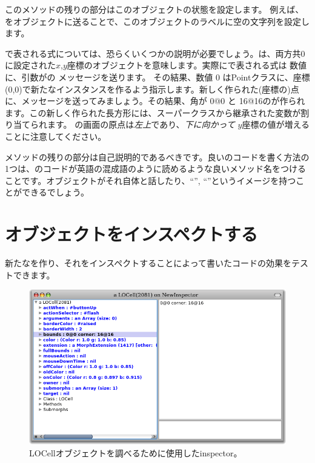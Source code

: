 \documentclass[a4paper,10pt,twoside]{book}
\begin{document}
このメソッドの残りの部分はこのオブジェクトの状態を設定します。
例えば、をオブジェクトに送ることで、このオブジェクトのラベルに空の文字列を設定します。

で表される式については、恐らくいくつかの説明が必要でしょう。は、両方共0に設定された$x$,$y$座標のオブジェクトを意味します。実際にで表される式は 数値に、引数がの メッセージを送ります。
その結果、数値 0 はPointクラスに、座標(0,0)で新たなインスタンスを作るよう指示します。新しく作られた(座標の)点に、メッセージを送ってみましょう。その結果、角が 0@0 と 16@16のが作られます。この新しく作られた長方形には、スーパークラスから継承された変数が割り当てられます。\pharo{} の画面の原点は\emph{左上}であり、\emph{下に向かって} $y$座標の値が増えることに注意してください。

メソッドの残りの部分は自己説明的であるべきです。良い\st{}のコードを書く方法の1つは、\st{}のコードが英語の混成語のように読めるような良いメソッド名をつけることです。オブジェクトがそれ自体と話したり、``'', ``''というイメージを持つことができるでしょう。

\section{オブジェクトをインスペクトする}

新たなを作り、それをインスペクトすることによって書いたコードの効果をテストできます。


\begin{figure}[htbp]
   \centering
   \includegraphics[width=\textwidth]{LOCellInspector} 
   \caption{LOCellオブジェクトを調べるために使用したinspector。}
\end{figure}
\end{document}
